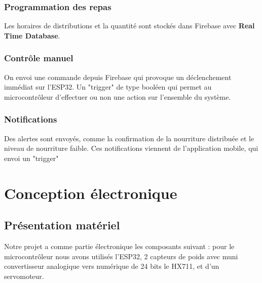 \subsection{Programmation des repas} 
Les horaires de distributions et la quantité sont stockés dans Firebase avec \textbf{Real Time Database}.

\subsection{Contrôle manuel}
On envoi une commande depuis Firebase qui provoque un déclenchement immédiat sur l’ESP32. Un "trigger" de type booléen qui permet au microcontrôleur d'effectuer  ou non une action sur l'ensemble du système.

\subsection{Notifications}
Des alertes sont envoyés, comme la confirmation de la nourriture distribuée et le niveau de nourriture faible. Ces notifications viennent de l'application mobile, qui envoi un "trigger"


\pagestyle{fancy}
\fancyhead{} %
\chapter{Conception électronique}
\section{Présentation matériel}
Notre projet a comme partie électronique les composants suivant : pour le microcontrôleur nous avons utilisés l'ESP32, 2 capteurs de poids avec muni convertisseur analogique vers numérique de 24 bits le HX711, et d'un servomoteur.

